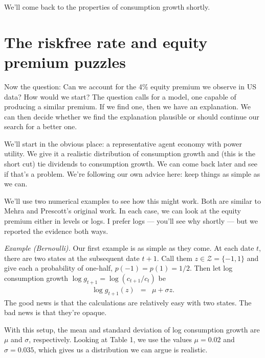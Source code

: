 \documentclass[11pt]{article}
\begin{document}
We'll come back to the properties of consumption growth shortly.


\section{The riskfree rate and equity premium puzzles}
\label{sec:equity-premium}

Now the question:  Can we account for the 4\% equity premium we observe in US data?
How would we start?
The question calls for a model, one capable of producing a similar premium.
If we find one, then we have an explanation.
We can then decide whether we find the explanation plausible
or should continue our search for a better one.

We'll start in the obvious place: a representative agent economy
with power utility.
We give it a realistic distribution of consumption growth
and (this is the short cut) tie dividends to consumption growth.
We can come back later and see if that's a problem.
We're following our own advice here:
keep things as simple as we can.

We'll use two numerical examples to see how this might work.
Both are similar to Mehra and Prescott's original work.
In each case, we can look at the equity premium either in levels or logs.
I prefer logs --- you'll see why shortly --- but we reported the evidence both ways.

{\it Example (Bernoulli).}
Our first example is as simple as they come.
At each date $t$, there are two states at the subsequent date $t+1$.
Call them $ z \in \mathcal{Z} = \{-1, 1\}$ and give each
a probability of one-half, $p(-1) = p(1) = 1/2$.
Then let  log consumption growth $\log g_{t+1} = \log (c_{t+1}/c_t)$ be
\begin{eqnarray*}
    \log g_{t+1}(z) &=& \mu + \sigma z .
\end{eqnarray*}
The good news is that the calculations are relatively easy with two states.
The bad news is that they're opaque.

With this setup, the mean and standard deviation of log consumption growth
are $\mu$ and $\sigma$, respectively.
Looking at Table 1, we use the values $\mu = 0.02$ and $\sigma = 0.035$,
which gives us a distribution we can argue is realistic.
\end{document}
